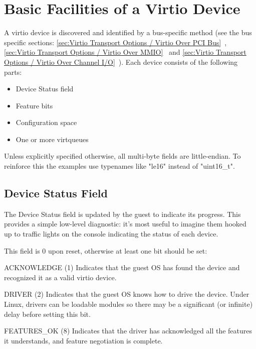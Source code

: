 \chapter{Basic Facilities of a Virtio Device}\label{sec:Basic Facilities of a Virtio Device}

A virtio device is discovered and identified by a bus-specific method
(see the bus specific sections: \ref{sec:Virtio Transport Options / Virtio Over PCI Bus}~,
\ref{sec:Virtio Transport Options / Virtio Over MMIO}~ and \ref{sec:Virtio Transport Options / Virtio Over Channel I/O}~).  Each
device consists of the following parts:

\begin{itemize}
\item Device Status field
\item Feature bits
\item Configuration space
\item One or more virtqueues
\end{itemize}

Unless explicitly specified otherwise, all multi-byte fields are little-endian.
To reinforce this the examples use typenames like "le16" instead of "uint16_t".

\section{Device Status Field}\label{sec:Basic Facilities of a Virtio Device / Device Status Field}

The Device Status field is updated by the guest to indicate its
progress. This provides a simple low-level diagnostic: it's most
useful to imagine them hooked up to traffic lights on the console
indicating the status of each device.

This field is 0 upon reset, otherwise at least one bit should be set:

  ACKNOWLEDGE (1) Indicates that the guest OS has found the
  device and recognized it as a valid virtio device.

  DRIVER (2) Indicates that the guest OS knows how to drive the
  device. Under Linux, drivers can be loadable modules so there
  may be a significant (or infinite) delay before setting this
  bit.

  FEATURES_OK (8) Indicates that the driver has acknowledged all the
  features it understands, and feature negotiation is complete.

